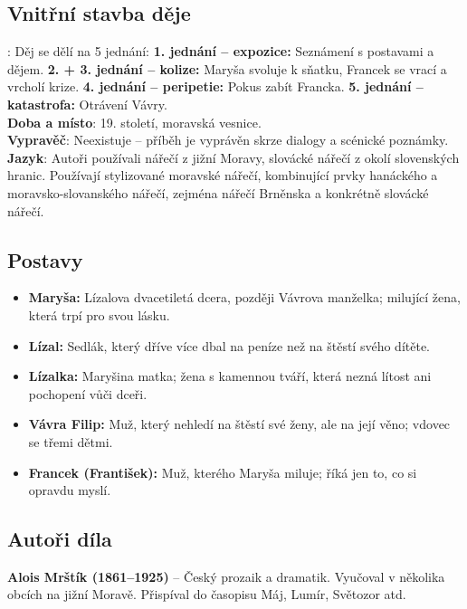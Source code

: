 \documentclass[12pt, a4paper]{article}
\newcommand{\mybf}[1]{\textcolor[RGB]{0, 179, 219}{\textbf{#1}}}
\begin{document}
\subsection*{Vnitřní stavba děje}: Děj se dělí na 5 jednání:
\vspace{0.5em}
\noindent\textbf{1. jednání -- expozice:} Seznámení s postavami a dějem.
\noindent\textbf{2. + 3. jednání -- kolize:} Maryša svoluje k sňatku, Francek se vrací a vrcholí krize.
\noindent\textbf{4. jednání -- peripetie:} Pokus zabít Francka.
\noindent\textbf{5. jednání -- katastrofa:} Otrávení Vávry.\\[10pt]
\mybf{Doba a místo}: 19. století, moravská vesnice.\\[10pt]
\mybf{Vypravěč}: Neexistuje -- příběh je vyprávěn skrze dialogy a scénické poznámky.\\[10pt]
\mybf{Jazyk}: Autoři používali nářečí z jižní Moravy, slovácké nářečí z okolí slovenských hranic. Používají stylizované moravské nářečí, kombinující prvky hanáckého a moravsko-slovanského nářečí, zejména nářečí Brněnska a konkrétně slovácké nářečí.\\[10pt]
\subsection*{Postavy}
\begin{itemize}[itemsep=0.3em]
	\item \textbf{Maryša:} Lízalova dvacetiletá dcera, později Vávrova manželka; milující žena, která trpí pro svou lásku.
	\item \textbf{Lízal:} Sedlák, který dříve více dbal na peníze než na štěstí svého dítěte.
	\item \textbf{Lízalka:} Maryšina matka; žena s kamennou tváří, která nezná lítost ani pochopení vůči dceři.
	\item \textbf{Vávra Filip:} Muž, který nehledí na štěstí své ženy, ale na její věno; vdovec se třemi dětmi.
	\item \textbf{Francek (František):} Muž, kterého Maryša miluje; říká jen to, co si opravdu myslí.
\end{itemize}

\subsection*{Autoři díla}
\textbf{Alois Mrštík (1861--1925)} -- Český prozaik a dramatik. Vyučoval v několika obcích na jižní Moravě. Přispíval do časopisu Máj, Lumír, Světozor atd.
\end{document}
